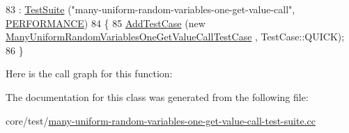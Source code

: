 \begin{DoxyCode}
83   : \hyperlink{classns3_1_1TestSuite_a904b0c40583b744d30908aeb94636d1a}{TestSuite} (\textcolor{stringliteral}{"many-uniform-random-variables-one-get-value-call"}, 
      \hyperlink{classns3_1_1TestSuite_a1ebfcab34ec8161e085e8e3a1855eae0a0d439cead7625e5ab851a783a72ada84}{PERFORMANCE})
84 \{
85   \hyperlink{classns3_1_1TestCase_a3718088e3eefd5d6454569d2e0ddd835}{AddTestCase} (\textcolor{keyword}{new} \hyperlink{classManyUniformRandomVariablesOneGetValueCallTestCase}{ManyUniformRandomVariablesOneGetValueCallTestCase}
      , TestCase::QUICK);
86 \}
\end{DoxyCode}


Here is the call graph for this function\+:




The documentation for this class was generated from the following file\+:\begin{DoxyCompactItemize}
\item 
core/test/\hyperlink{many-uniform-random-variables-one-get-value-call-test-suite_8cc}{many-\/uniform-\/random-\/variables-\/one-\/get-\/value-\/call-\/test-\/suite.\+cc}\end{DoxyCompactItemize}
